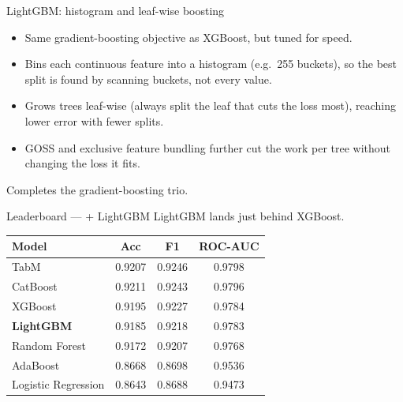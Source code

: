 \documentclass[aspectratio=169]{beamer}
\begin{document}
\begin{frame}{LightGBM: histogram and leaf-wise boosting}
\small
\begin{itemize}
    \item Same gradient-boosting objective as XGBoost, but tuned for speed.
    \item Bins each continuous feature into a histogram (e.g.\ 255 buckets), so
          the best split is found by scanning buckets, not every value.
    \item Grows trees leaf-wise (always split the leaf that cuts the loss most),
          reaching lower error with fewer splits.
    \item GOSS and exclusive feature bundling further cut the work per tree
          without changing the loss it fits.
\end{itemize}
\vspace{0.1cm}
{\footnotesize Completes the gradient-boosting trio.}
\end{frame}

\begin{frame}{Leaderboard --- + LightGBM}
\footnotesize
LightGBM lands just behind XGBoost.
\vspace{0.25cm}
\begin{center}
\begin{tabular}{lccc}
\toprule
\textbf{Model} & \textbf{Acc} & \textbf{F1} & \textbf{ROC-AUC} \\
\midrule
TabM & 0.9207 & 0.9246 & 0.9798 \\
CatBoost & 0.9211 & 0.9243 & 0.9796 \\
XGBoost & 0.9195 & 0.9227 & 0.9784 \\
\rowcolor{accent!18}\textbf{LightGBM} & 0.9185 & 0.9218 & 0.9783 \\
Random Forest & 0.9172 & 0.9207 & 0.9768 \\
AdaBoost & 0.8668 & 0.8698 & 0.9536 \\
Logistic Regression & 0.8643 & 0.8688 & 0.9473 \\
\bottomrule
\end{tabular}
\end{center}
\end{frame}
\end{document}
